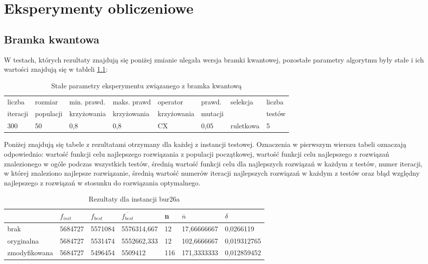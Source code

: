 \chapter{Eksperymenty obliczeniowe}
\label{cha:eksperymenty}
\section{Bramka kwantowa}
W testach, których rezultaty znajdują się poniżej zmianie ulegała wersja bramki kwantowej, pozostałe parametry algorytmu były stałe i ich wartości znajdują się w tableli \ref{T1_params}:

\begin{table}[H]
\label{T1_params}
\begin{tabular}{l l l l l l l l}
\hline
liczba & rozmiar & min. prawd. & maks. prawd & operator & prawd. & selekcja & liczba \\
iteracji & populacji & krzyżowania & krzyżowania & krzyżowania & mutacji & & testów \\
\hline
300 & 50 & 0,8 & 0,8 & CX & 0,05 & ruletkowa & 5 \\
\hline
\end{tabular}
\caption{Stałe parametry eksperymentu związanego z bramka kwantową}
\end{table}

Poniżej znajdują się tabele z rezultatami otrzymany dla każdej z instancji testowej. Oznaczenia w pierwszym wierszu tabeli oznaczają odpowiednio: wartość funkcji celu najlepszego rozwiązania z populacji początkowej, wartość funkcji celu najlepszego z rozwiązań znalezionego w ogóle podczas wszystkich testów, średnią wartość funkcji celu dla najlepszych rozwiązań w każdym z testów, numer iteracji, w której znaleziono najlepsze rozwiązanie, średnią wartość numerów iteracji najlepszych rozwiązań w każdym z testów oraz błąd względny najlepszego z rozwiązań w stosunku do rozwiązania optymalnego.

\begin{table}[H]
\label{T1_bur26a}
\begin{tabular}{l l l l l l l}
\hline
 & $f_{init}$ & $f_{best}$ & $\overline{f_{best}}$ & n & $\overline{n}$ & $\delta$ \\
\hline
brak & 5684727 & 5571084 & 5576314,667 & 12 & 17,66666667 & 0,0266119 \\
oryginalna & 5684727 & 5531474 & 5552662,333 & 12 & 102,6666667 & 0,019312765 \\
zmodyfikowana & 5684727 & 5496454 & 5509412 & 116 & 171,3333333 & 0,012859452 \\
\hline
\end{tabular}
\caption{Rezultaty dla instancji bur26a}
\end{table}

